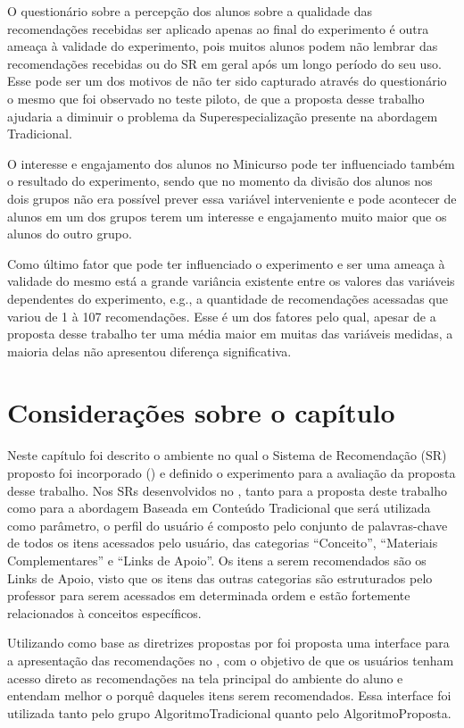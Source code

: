 O questionário sobre a percepção dos alunos sobre a qualidade das recomendações recebidas ser aplicado apenas ao final
do experimento é outra ameaça à validade do experimento, pois muitos alunos podem não lembrar das recomendações recebidas
ou do SR em geral após um longo período do seu uso. Esse pode ser um dos motivos de não ter sido capturado através do
questionário o mesmo que foi observado no teste piloto, de que a proposta desse trabalho ajudaria a diminuir o
problema da Superespecialização presente na abordagem Tradicional.

O interesse e engajamento dos alunos no Minicurso pode ter influenciado também o resultado do experimento, sendo que no momento
da divisão dos alunos nos dois grupos não era possível prever essa variável interveniente e pode acontecer de alunos em
um dos grupos terem um interesse e engajamento muito maior que os alunos do outro grupo.

Como último fator que pode ter influenciado o experimento e ser uma ameaça à validade do mesmo está a grande variância
existente entre os valores das variáveis dependentes do experimento, e.g., a quantidade de recomendações acessadas que variou
de 1 à 107 recomendações. Esse é um dos fatores pelo qual, apesar de a proposta desse trabalho ter uma média maior em
muitas das variáveis medidas, a maioria delas não apresentou diferença significativa.

\section{Considerações sobre o capítulo}

Neste capítulo foi descrito o ambiente no qual o Sistema de Recomendação (SR) proposto foi incorporado (\adaptweb) e definido o
experimento para a avaliação da proposta desse trabalho. Nos SRs desenvolvidos no \adaptweb, tanto para a proposta
deste trabalho como para a abordagem Baseada em Conteúdo Tradicional que será utilizada como parâmetro, o perfil do
usuário é composto pelo conjunto de palavras-chave de todos os itens acessados pelo usuário, das
categorias ``Conceito'', ``Materiais Complementares'' e ``Links de Apoio''. Os itens a serem recomendados são os
Links de Apoio, visto que os itens das outras categorias são estruturados pelo professor para serem acessados em determinada
ordem e estão fortemente relacionados à conceitos específicos.

Utilizando como base as diretrizes propostas por  foi proposta uma interface para a
apresentação das recomendações no \adaptweb, com o objetivo de que os usuários tenham acesso direto as recomendações na
tela principal do ambiente do aluno e entendam melhor o porquê daqueles itens serem recomendados. Essa interface foi
utilizada tanto pelo grupo AlgoritmoTradicional quanto pelo AlgoritmoProposta.

